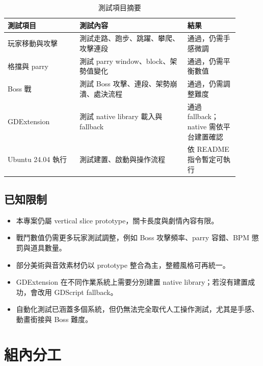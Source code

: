 \documentclass[12pt,a4paper]{article}
\begin{document}
\begin{table}[H]
\centering
\caption{測試項目摘要}
\begin{tabular}{p{0.28\linewidth}p{0.42\linewidth}p{0.2\linewidth}}
\toprule
測試項目 & 測試內容 & 結果 \\
\midrule
玩家移動與攻擊 & 測試走路、跑步、跳躍、攀爬、攻擊連段 & 通過，仍需手感微調 \\
格擋與 parry & 測試 parry window、block、架勢值變化 & 通過，仍需平衡數值 \\
Boss 戰 & 測試 Boss 攻擊、連段、架勢崩潰、處決流程 & 通過，仍需調整難度 \\
GDExtension & 測試 native library 載入與 fallback & 通過 fallback；native 需依平台建置確認 \\
Ubuntu 24.04 執行 & 測試建置、啟動與操作流程 & 依 README 指令暫定可執行 \\
\bottomrule
\end{tabular}
\end{table}

\subsection{已知限制}
\begin{itemize}[leftmargin=2em]
  \item 本專案仍屬 vertical slice prototype，關卡長度與劇情內容有限。
  \item 戰鬥數值仍需更多玩家測試調整，例如 Boss 攻擊頻率、parry 容錯、BPM 懲罰與道具數量。
  \item 部分美術與音效素材仍以 prototype 整合為主，整體風格可再統一。
  \item GDExtension 在不同作業系統上需要分別建置 native library；若沒有建置成功，會改用 GDScript fallback。
  \item 自動化測試已涵蓋多個系統，但仍無法完全取代人工操作測試，尤其是手感、動畫銜接與 Boss 難度。
\end{itemize}

\section{組內分工}
\end{document}
